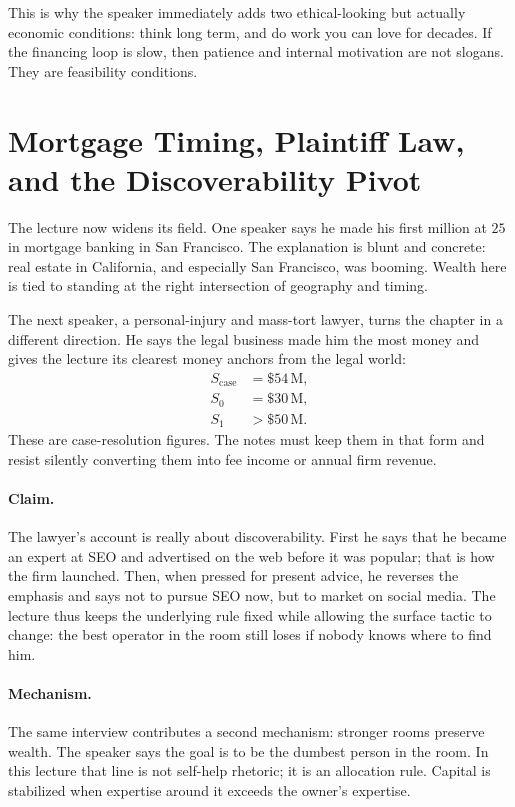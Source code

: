 This is why the speaker immediately adds two ethical-looking but actually economic conditions: think long term, and do work you can love for decades. If the financing loop is slow, then patience and internal motivation are not slogans. They are feasibility conditions.

\section{Mortgage Timing, Plaintiff Law, and the Discoverability Pivot}

The lecture now widens its field. One speaker says he made his first million at \(25\) in mortgage banking in San Francisco. The explanation is blunt and concrete: real estate in California, and especially San Francisco, was booming. Wealth here is tied to standing at the right intersection of geography and timing.

The next speaker, a personal-injury and mass-tort lawyer, turns the chapter in a different direction. He says the legal business made him the most money and gives the lecture its clearest money anchors from the legal world:
\begin{align}
S_{\mathrm{case}} &= \$54\,\mathrm{M},\\
S_0 &= \$30\,\mathrm{M},\\
S_1 &> \$50\,\mathrm{M}.
\end{align}
These are case-resolution figures. The notes must keep them in that form and resist silently converting them into fee income or annual firm revenue.

\paragraph{Claim.} The lawyer's account is really about discoverability. First he says that he became an expert at SEO and advertised on the web before it was popular; that is how the firm launched. Then, when pressed for present advice, he reverses the emphasis and says not to pursue SEO now, but to market on social media. The lecture thus keeps the underlying rule fixed while allowing the surface tactic to change: the best operator in the room still loses if nobody knows where to find him.

\paragraph{Mechanism.} The same interview contributes a second mechanism: stronger rooms preserve wealth. The speaker says the goal is to be the dumbest person in the room. In this lecture that line is not self-help rhetoric; it is an allocation rule. Capital is stabilized when expertise around it exceeds the owner's expertise.

